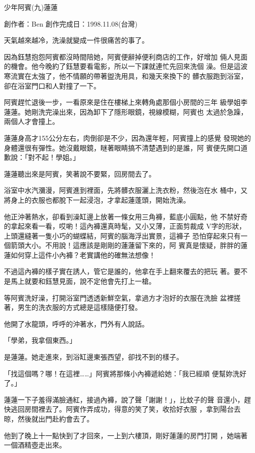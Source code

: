 



少年阿賓(九)蓮蓮

創作者：Ben
創作完成日：1998.11.08(台灣)


天氣越來越冷，洗澡就變成一件很痛苦的事了。

因為鈺慧抱怨阿賓都沒時間陪她，阿賓便辭掉便利商店的工作，好增加
倆人見面的機會。他今晚約了鈺慧要看電影，所以一下課就連忙先回來洗個
澡。但是這波寒流實在太強了，他不情願的帶著盥洗用具，和幾天來換下的
髒衣服跑到浴室，卻在浴室門口和人對撞了一下。

阿賓趕忙退後一步，一看原來是住在樓梯上來轉角處那個小房間的三年
級學姐李蓮蓮。她剛洗完澡出來，因為卸下了隱形眼鏡，視線模糊，阿賓也
太過於急躁，兩個人才會撞上。

蓮蓮身高才155公分左右，肉倒卻是不少，因為還年輕，阿賓撞上的感覺
發現她的身體還很有彈性。她沒戴眼鏡，瞇著眼睛搞不清楚遇到的是誰，阿
賓便先開口道歉說：「對不起！學姐。」

蓮蓮聽出來是阿賓，笑著說不要緊，回房間去了。

浴室中水汽瀰漫，阿賓進到裡面，先將髒衣服灑上洗衣粉，然後泡在水
桶中，又將身上的衣服也都脫下一起浸泡，才拿起蓮蓬頭，開始洗澡。

他正沖著熱水，卻看到澡缸邊上放著一條女用三角褲，藍底小圓點，他
不禁好奇的拿起來看一看，哎喲！這內褲還真時髦，又小又薄，正面剪裁成
V字的形狀，上頭還縫著一隻小巧的蝴蝶結，阿賓的腦海浮出實景，這褲子
恐怕穿起來只有一個箭頭大小。不用說！這應該是剛剛的蓮蓮留下來的，阿
賓真是懷疑，胖胖的蓮蓮如何穿上這件小內褲？老實講他的確無法想像！

不過這內褲的樣子實在誘人，管它是誰的，他拿在手上翻來覆去的把玩
著。要不是馬上就要和鈺慧見面，說不定他會先打上一槍。

等阿賓洗好澡，打開浴室門透透新鮮空氣，拿過方才泡好的衣服在洗臉
盆裡搓著，男生的洗衣服的方式總是這樣隨便打發。

他開了水龍頭，呼呼的沖著水，門外有人說話。

「學弟，我拿個東西。」

是蓮蓮。她走進來，到浴缸邊東張西望，卻找不到的樣子。

「找這個嗎？哪！在這裡……」阿賓將那條小內褲遞給她：「我已經順
便幫妳洗好了。」

蓮蓮一下子羞得滿臉通紅，接過內褲，說了聲「謝謝！」，比蚊子的聲
音還小，趕快逃回房間裡去了。阿賓作弄成功，得意的笑了笑，收拾好衣服
，拿到陽台去晾，然後就出門赴約會去了。

他到了晚上十一點快到了才回來，一上到六樓頂，剛好蓮蓮的房門打開
，她端著一個酒精壺走出來。

